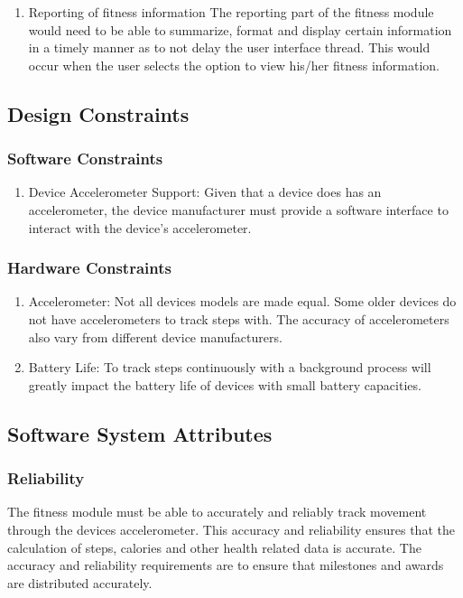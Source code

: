 \begin{enumerate}
	
	\item Reporting of fitness information
	\newline
	The reporting part of the fitness module would need to be able to summarize, format and display certain information in a timely manner as to not delay the user interface thread. This would occur when the user selects the option to view his/her fitness information.
	
\end{enumerate}

\subsection{Design Constraints}

\subsubsection{Software Constraints}
\begin{enumerate}
	\item Device Accelerometer Support:
	\newline
	Given that a device does has an accelerometer, the device manufacturer must provide a software interface to interact with the device's accelerometer.
\end{enumerate}

\subsubsection{Hardware Constraints}
\begin{enumerate}
	\item Accelerometer:
	\newline
	Not all devices models are made equal. Some older devices do not have accelerometers to track steps with. The accuracy of accelerometers also vary from different device manufacturers.
	\item Battery Life:
	\newline
	To track steps continuously with a background process will greatly impact the battery life of devices with small battery capacities. 
\end{enumerate}

\subsection{Software System Attributes} 
\subsubsection{Reliability} 
The fitness module must be able to accurately and reliably track movement through the devices accelerometer. This accuracy and reliability ensures that the calculation of steps, calories and other health related data is accurate. The accuracy and reliability requirements are to ensure that milestones and awards are distributed accurately.    

